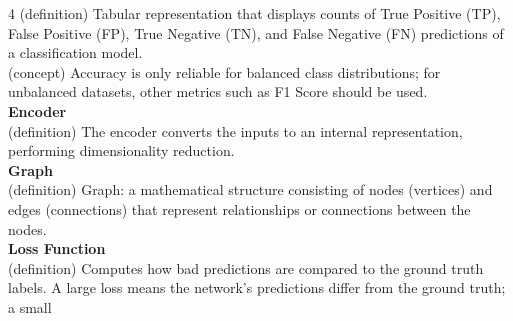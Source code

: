 \documentclass[8pt]{extarticle}
\begin{document}
\begin{multicols}{4}
(definition) Tabular representation that displays counts of True Positive (TP), False Positive (FP), True Negative (TN), and False Negative (FN) predictions of a classification model.\\
(concept) Accuracy is only reliable for balanced class distributions; for unbalanced datasets, other metrics such as F1 Score should be used.\\
\vspace{2pt}\textbf{Encoder}\\
(definition) The encoder converts the inputs to an internal representation, performing dimensionality reduction.\\
\vspace{2pt}\textbf{Graph}\\
(definition) Graph: a mathematical structure consisting of nodes (vertices) and edges (connections) that represent relationships or connections between the nodes.\\
\vspace{2pt}\textbf{Loss Function}\\
(definition) Computes how bad predictions are compared to the ground truth labels. A large loss means the network’s predictions differ from the ground truth; a small


\end{multicols}
\end{document}
